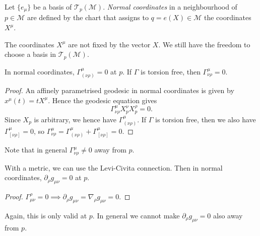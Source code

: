 \documentclass{jknotes}
\begin{document}
\begin{defn}
    Let \(\{e_\mu\}\) be a basis of \(\mathcal{T}_p(\mathcal{M})\). \emph{Normal coordinates} in a neighbourhood of \(p\in\mathcal{M}\) are defined by the chart that assigns to \(q = e(X) \in \mathcal{M}\) the coordinates \(X^\mu\).
\end{defn}

The coordinates \(X^\mu\) are not fixed by the vector \(X\). We still have the freedom to choose a basis in \(\mathcal{T}_p(\mathcal{M})\).

\begin{lemma}
    In normal coordinates, \(\Gamma^\mu_{(\nu\rho)}=0\) at \(p\). If \(\Gamma\) is torsion free, then \(\Gamma^\mu_{\nu\rho}=0\).
\end{lemma}
\begin{proof}
    An affinely parametrised geodesic in normal coordinates is given by \(x^\mu(t) = tX^\mu\). Hence the geodesic equation gives
    \begin{equation}
        \Gamma^\mu_{\nu\rho}X^\nu_pX^\rho_p = 0.
    \end{equation}
    Since \(X_p\) is arbitrary, we hence have \(\Gamma^\mu_{(\nu\rho)}\). If \(\Gamma\) is torsion free, then we also have \(\Gamma^\mu_{[\nu\rho]}=0\), so \(\Gamma^\mu_{\nu\rho} = \Gamma^\mu_{(\nu\rho)} + \Gamma^\mu_{[\nu\rho]} = 0\).
\end{proof}
Note that in general \(\Gamma^\mu_{\nu\rho} \ne 0\) away from \(p\).

\begin{lemma}
    With a metric, we can use the Levi-Civita connection. Then in normal coordinates, \(\partial_\rho g_{\mu\nu}=0\) at \(p\).
\end{lemma}
\begin{proof}
    \(\Gamma^\rho_{\mu\nu}=0 \implies \partial_\rho g_{\mu\nu} = \nabla_\rho g_{\mu\nu} = 0\).
\end{proof}
Again, this is only valid at \(p\). In general we cannot make \(\partial_\rho g_{\mu\nu}=0\) also away from \(p\).
\end{document}
